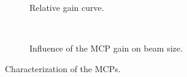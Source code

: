 \begin{figure}[!ht]
  \begin{subfigure}[t]{0.5\textwidth}
    
    \caption{Relative gain curve.}
    \label{MCP_gain_a}
  \end{subfigure}
  ~
  \begin{subfigure}[t]{0.5\textwidth}
    
    \caption{Influence of the MCP gain on beam size.}
    \label{MCP_gain_b}
  \end{subfigure}
  \caption[Characterization of the MCPs]{Characterization of the MCPs.}
  \label{chap4:MCP_gain}
\end{figure}
